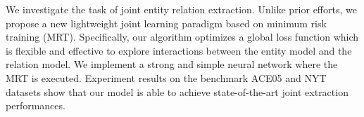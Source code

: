 We investigate the task of joint entity relation extraction. Unlike prior efforts, we propose a new lightweight joint learning paradigm based on minimum risk training (MRT). Specifically, our algorithm optimizes a global loss function which is flexible and effective to explore interactions between the entity model and the relation model. We implement a strong and simple neural network where the MRT is executed. Experiment results on the benchmark ACE05 and NYT datasets show that our model is able to achieve state-of-the-art joint extraction performances.
